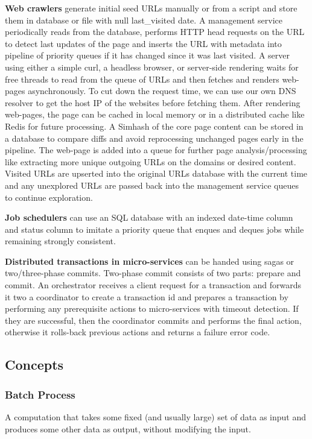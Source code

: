 \documentclass{article}
\begin{document}
    \textbf{Web crawlers} generate initial seed URLs manually or from a script and store them in database or file with null last\_visited date. A management service periodically reads from the database, performs HTTP head requests on the URL to detect last updates of the page and inserts the URL with metadata into pipeline of priority queues if it has changed since it was last visited. A server using either a simple curl, a headless browser, or server-side rendering waits for free threads to read from the queue of URLs and then fetches and renders web-pages asynchronously. To cut down the request time, we can use our own DNS resolver to get the host IP of the websites before fetching them. After rendering web-pages, the page can be cached in local memory or in a distributed cache like Redis for future processing. A Simhash of the core page content can be stored in a database to compare diffs and avoid reprocessing unchanged pages early in the pipeline. The web-page is added into a queue for further page analysis/processing like extracting more unique outgoing URLs on the domains or desired content. Visited URLs are upserted into the original URLs database with the current time and any unexplored URLs are passed back into the management service queues to continue exploration.
    
    \textbf{Job schedulers} can use an SQL database with an indexed date-time column and status column to imitate a priority queue that enques and deques jobs while remaining strongly consistent.
    
    \textbf{Distributed transactions in micro-services} can be handed using sagas or two/three-phase commits. Two-phase commit consists of two parts: prepare and commit. An orchestrator receives a client request for a transaction and forwards it two a coordinator to create a transaction id and prepares a transaction by performing any prerequisite actions to micro-services with timeout detection. If they are successful, then the coordinator commits and performs the final action, otherwise it rolls-back previous actions and returns a failure error code.
    

    \subsection{Concepts}
    
    \subsubsection{Batch Process}
    A computation that takes some fixed (and usually large) set of data as input and produces some other data as output, without modifying the input.
    
\end{document}
